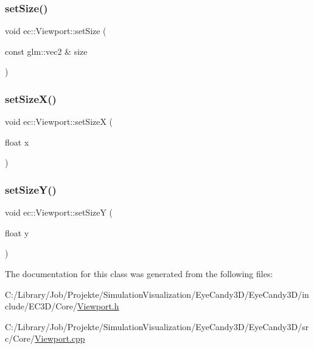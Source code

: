 \mbox{\label{classec_1_1_viewport_ad8e05ac01f4c19c599f6b7dc344b815c}} 
\subsubsection{\texorpdfstring{set\+Size()}{setSize()}\hspace{0.1cm}{\footnotesize\ttfamily [2/2]}}
{\footnotesize\ttfamily void ec\+::\+Viewport\+::set\+Size (\begin{DoxyParamCaption}\item[{const glm\+::vec2 \&}]{size }\end{DoxyParamCaption})}

\mbox{\label{classec_1_1_viewport_af1bcf1e3a8a06458c41a0c646b5f2057}} 
\subsubsection{\texorpdfstring{set\+Size\+X()}{setSizeX()}}
{\footnotesize\ttfamily void ec\+::\+Viewport\+::set\+SizeX (\begin{DoxyParamCaption}\item[{float}]{x }\end{DoxyParamCaption})}

\mbox{\label{classec_1_1_viewport_ae9420c066d2bf6f1a6cc5c0b65092862}} 
\subsubsection{\texorpdfstring{set\+Size\+Y()}{setSizeY()}}
{\footnotesize\ttfamily void ec\+::\+Viewport\+::set\+SizeY (\begin{DoxyParamCaption}\item[{float}]{y }\end{DoxyParamCaption})}



The documentation for this class was generated from the following files\+:\begin{DoxyCompactItemize}
\item 
C\+:/\+Library/\+Job/\+Projekte/\+Simulation\+Visualization/\+Eye\+Candy3\+D/\+Eye\+Candy3\+D/include/\+E\+C3\+D/\+Core/\mbox{\hyperlink{_viewport_8h}{Viewport.\+h}}\item 
C\+:/\+Library/\+Job/\+Projekte/\+Simulation\+Visualization/\+Eye\+Candy3\+D/\+Eye\+Candy3\+D/src/\+Core/\mbox{\hyperlink{_viewport_8cpp}{Viewport.\+cpp}}\end{DoxyCompactItemize}
